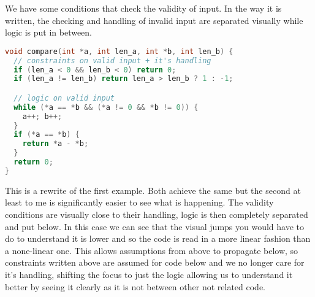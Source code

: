 \documentclass[a4paper]{article}
\begin{document}
We have some conditions that check the validity of input. In the way it is written, the checking and handling of invalid input are separated visually while logic is put in between. 

\begin{lstlisting}[language=c++]
void compare(int *a, int len_a, int *b, int len_b) { 
  // constraints on valid input + it's handling
  if (len_a < 0 && len_b < 0) return 0;
  if (len_a != len_b) return len_a > len_b ? 1 : -1;

  // logic on valid input
  while (*a == *b && (*a != 0 && *b != 0)) { 
    a++; b++;
  }
  if (*a == *b) { 
    return *a - *b;
  }
  return 0;
}
\end{lstlisting}

This is a rewrite of the first example. Both achieve the same but the second at least to me is significantly easier to see what is happening. The validity conditions are visually close to their handling, logic is then completely separated and put below. In this case we can see that the visual jumps you would have to do to understand it is lower and so the code is read in a more linear fashion than a none-linear one. This allows assumptions from above to propagate below, so constraints written above are assumed for code below and we no longer care for it's handling, shifting the focus to just the logic allowing us to understand it better by seeing it clearly as it is not between other not related code. 
\end{document}
